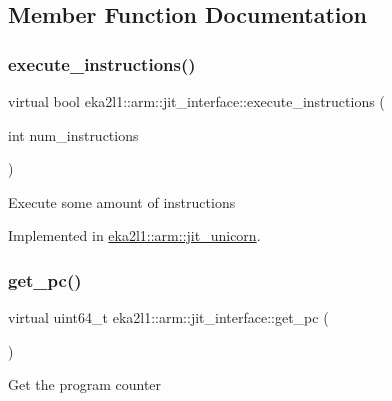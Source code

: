 \subsection{Member Function Documentation}
\mbox{\label{classeka2l1_1_1arm_1_1jit__interface_a6dbaf8bc64fd987c3b1d96f2644c3811}} 
\subsubsection{\texorpdfstring{execute\+\_\+instructions()}{execute\_instructions()}}
{\footnotesize\ttfamily virtual bool eka2l1\+::arm\+::jit\+\_\+interface\+::execute\+\_\+instructions (\begin{DoxyParamCaption}\item[{int}]{num\+\_\+instructions }\end{DoxyParamCaption})\hspace{0.3cm}{\ttfamily [pure virtual]}}

Execute some amount of instructions 

Implemented in \mbox{\hyperlink{classeka2l1_1_1arm_1_1jit__unicorn_a3a03be2a0e9c1ea1f83b74fdcdc3c7ce}{eka2l1\+::arm\+::jit\+\_\+unicorn}}.

\mbox{\label{classeka2l1_1_1arm_1_1jit__interface_a89fd7fc20ee959606a71eecb959c610d}} 
\subsubsection{\texorpdfstring{get\+\_\+pc()}{get\_pc()}}
{\footnotesize\ttfamily virtual uint64\+\_\+t eka2l1\+::arm\+::jit\+\_\+interface\+::get\+\_\+pc (\begin{DoxyParamCaption}{ }\end{DoxyParamCaption})\hspace{0.3cm}{\ttfamily [pure virtual]}}

Get the program counter 

